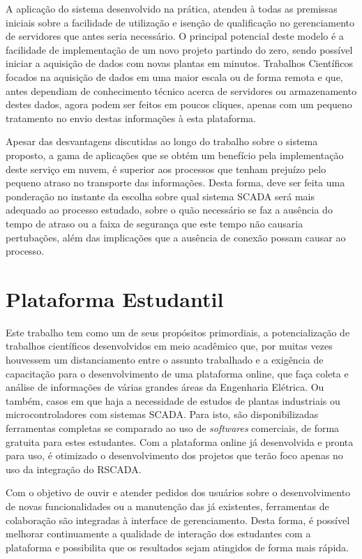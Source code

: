 A aplicação do sistema desenvolvido na prática, atendeu à todas as premissas iniciais sobre a facilidade de utilização e isenção de qualificação no gerenciamento de servidores que antes seria necessário. O principal potencial deste modelo é a facilidade de implementação de um novo projeto partindo do zero, sendo possível iniciar a aquisição de dados com novas plantas em minutos. Trabalhos Científicos focados na aquisição de dados em uma maior escala ou de forma remota e que, antes dependiam de conhecimento técnico acerca de servidores ou armazenamento destes dados, agora podem ser feitos em poucos cliques, apenas com um pequeno tratamento no envio destas informações à esta plataforma.

Apesar das desvantagens discutidas ao longo do trabalho sobre o sistema proposto, a gama de aplicações que se obtém um benefício pela implementação deste serviço em nuvem, é superior aos processos que tenham prejuízo pelo pequeno atraso no transporte das informações. Desta forma, deve ser feita uma ponderação no instante da escolha sobre qual sistema \gls{SCADA} será mais adequado ao processo estudado, sobre o quão necessário se faz a ausência do tempo de atraso ou a faixa de segurança que este tempo não causaria pertubações, além das implicações que a ausência de conexão possam causar ao processo.

\section{Plataforma Estudantil}
\label{sec:plataforma-estudantil}

Este trabalho tem como um de seus propósitos primordiais, a potencialização de trabalhos científicos desenvolvidos em meio acadêmico que, por muitas vezes houvessem um distanciamento entre o assunto trabalhado e a exigência de capacitação para o desenvolvimento de uma plataforma online, que faça coleta e análise de informações de várias grandes áreas da Engenharia Elétrica. Ou também, casos em que haja a necessidade de estudos de plantas industriais ou microcontroladores com sistemas \gls{SCADA}. Para isto, são disponibilizadas ferramentas completas se comparado ao uso de \textit{softwares} comerciais, de forma gratuita para estes estudantes. Com a plataforma online já desenvolvida e pronta para uso, é otimizado o desenvolvimento dos projetos que terão foco apenas no uso da integração do RSCADA.

Com o objetivo de ouvir e atender pedidos dos usuários sobre o desenvolvimento de novas funcionalidades ou a manutenção das já existentes, ferramentas de colaboração são integradas à interface de gerenciamento. Desta forma, é possível melhorar continuamente a qualidade de interação dos estudantes com a plataforma e possibilita que os resultados sejam atingidos de forma mais rápida.


